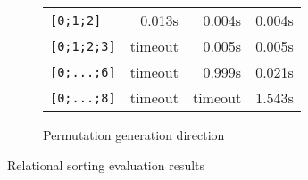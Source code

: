 \begin{figure*}[t!]
\begin{subfigure}[b]{0.48\textwidth}
\begin{tabular}{l||c|r||r}
      \texttt{{[}0;1;2{]}}   & \multicolumn{1}{r|}{0.013s}                                                    & 0.004s                                                                         & 0.004s                                          \\
      \texttt{{[}0;1;2;3{]}} & timeout                                                                       & 0.005s                                                                         & 0.005s                                          \\
      \texttt{{[}0;...;6{]}}  & timeout                                                                       & 0.999s                                                                         & 0.021s                                          \\
      \texttt{{[}0;...;8{]}} & timeout                                                                       & \multicolumn{1}{c||}{timeout}                                                   & 1.543s
      \end{tabular}
    \caption{Permutation generation direction}
    \label{fig:sort_perm}
  \end{subfigure}
  \caption{Relational sorting evaluation results}
  \label{tbl:sort}
\end{figure*}
